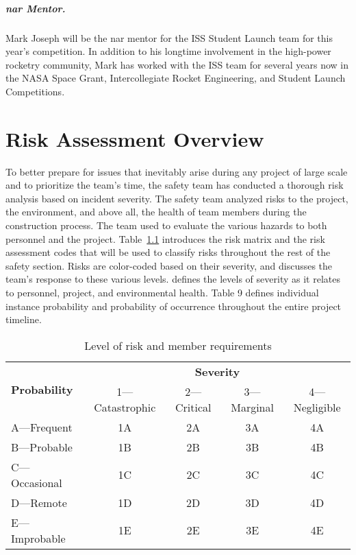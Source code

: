 \paragraph{\gls{nar} Mentor.}

Mark Joseph will be the \gls{nar} mentor for the ISS Student Launch team for this year's competition. In addition to his longtime involvement in the high-power rocketry community, Mark has worked with the ISS team for several years now in the NASA Space Grant, Intercollegiate Rocket Engineering, and Student Launch Competitions.

\chapter{Risk Assessment Overview}

To better prepare for issues that inevitably arise during any project of large scale and to prioritize the team's time, the safety team has conducted a thorough risk analysis based on incident severity. The safety team analyzed risks to the project, the environment, and above all, the health of team members during the construction process. The team used  to evaluate the various hazards to both personnel and the project. Table~\ref{tab:level of risk and member requirements} introduces the risk matrix and the risk assessment codes that will be used to classify risks throughout the rest of the safety section. Risks are color-coded based on their severity, and  discusses the team's response to these various levels.  defines the levels of severity as it relates to personnel, project, and environmental health. Table 9 defines individual instance probability and probability of occurrence throughout the entire project timeline.

\begin{table}[H]
    \centering
    \caption{Level of risk and member requirements}
    \label{tab:level of risk and member requirements}
    \begin{tabularx}{0.8\linewidth}{X c c c c}
        \toprule
       \multirow{2}{*}{\textbf{Probability}} & \multicolumn{4}{c}{\textbf{Severity}} \\
       \cmidrule(l){2-5}
        & 1---Catastrophic & 2---Critical & 3---Marginal & 4---Negligible \\
       \midrule
       A---Frequent & \cellcolor{red!25} 1A & \cellcolor{red!25} 2A & \cellcolor{orange!25} 3A & \cellcolor{green!25} 4A \\
       B---Probable & \cellcolor{red!25} 1B & \cellcolor{red!25} 2B & \cellcolor{orange!25} 3B & \cellcolor{green!25} 4B \\
       C---Occasional & \cellcolor{red!25} 1C & \cellcolor{orange!25} 2C & \cellcolor{orange!25} 3C & 4C \\
       D---Remote & \cellcolor{orange!25} 1D & \cellcolor{orange!25} 2D & \cellcolor{green!25} 3D & 4D \\
       E---Improbable & \cellcolor{green!25} 1E & \cellcolor{green!25} 2E & \cellcolor{green!25} 3E & 4E \\
       \bottomrule
    \end{tabularx}
\end{table}